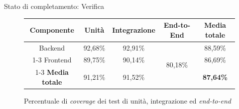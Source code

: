 \documentclass{beamer}
\begin{document}
\begin{frame}{Stato di completamento: Verifica}
  \begin{figure}
    \centering
    \footnotesize
    \begin{tabular}{|c|c|c|c|c|}
      \hline
      \cellcolor{aziendaPrimary!20}\textbf{Componente}   & \cellcolor{aziendaPrimary!20}\textbf{Unità}
                                                         & \cellcolor{aziendaPrimary!20}\textbf{Integrazione} & \cellcolor{aziendaPrimary!20}\textbf{End-to-End}
                                                         & \cellcolor{aziendaPrimary!20}\textbf{Media totale}                                                                                                                                \\
      \hline
      Backend                                            & 92,68\%                                            & 92,91\%                                          & \multirow{3}{*}{80,18\%} & 88,59\%                                        \\
      \cline{1-3} \cline{5-5}
      Frontend                                           & 89,75\%                                            & 90,14\%                                          &                          & 86,69\%                                        \\
      \cline{1-3} \cline{5-5}
      \cellcolor{aziendaPrimary!20}\textbf{Media totale} & 91,21\%                                            & 91,52\%                                          &                          & \cellcolor{aziendaPrimary!20} \textbf{87,64\%} \\
      \hline
    \end{tabular}
    \caption{Percentuale di \textit{coverage} dei test di unità, integrazione ed \textit{end-to-end}}
  \end{figure}
\end{frame}
\end{document}
